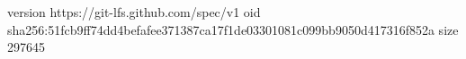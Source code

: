 version https://git-lfs.github.com/spec/v1
oid sha256:51fcb9ff74dd4befafee371387ca17f1de03301081c099bb9050d417316f852a
size 297645
